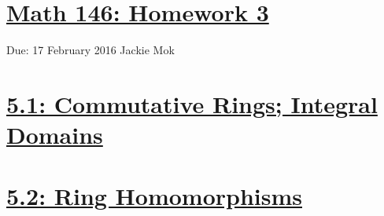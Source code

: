 \documentclass{article}
\begin{document}
\section*{\underline{Math 146: Homework 3}}
Due: 17 February 2016
\newline Jackie Mok

\vspace{10 mm}

\section*{\underline{5.1: Commutative Rings; Integral Domains}}





\section*{\underline{5.2: Ring Homomorphisms}}





\end{document}
